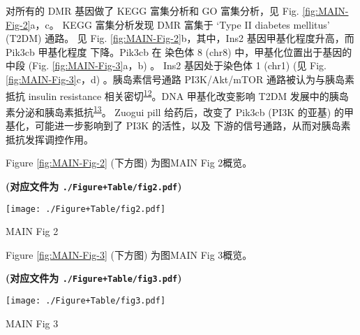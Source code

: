 \documentclass[
]{article}
\begin{document}
对所有的 DMR 基因做了 KEGG 富集分析和 GO 富集分析，见 Fig. \ref{fig:MAIN-Fig-2}a，c。
KEGG 富集分析发现 DMR 富集于 `Type II diabetes mellitus' (T2DM) 通路。
见 Fig. \ref{fig:MAIN-Fig-2}b，其中，Ins2 基因甲基化程度升高，而 Pik3cb 甲基化程度
下降。Pik3cb 在 染色体 8 (chr8) 中，甲基化位置出于基因的中段
(Fig. \ref{fig:MAIN-Fig-3}a，b) 。
Ins2 基因处于染色体 1 (chr1) (见 Fig. \ref{fig:MAIN-Fig-3}c，d) 。胰岛素信号通路 PI3K/Akt/mTOR 通路被认为与胰岛素抵抗 insulin resistance 相关密切\textsuperscript{\protect\hyperlink{ref-ImpairmentOfIRamasu2023}{12}}。DNA 甲基化改变影响 T2DM 发展中的胰岛素分泌和胰岛素抵抗\textsuperscript{\protect\hyperlink{ref-DnaMethylationZhou2018}{13}}。
Zuogui pill 给药后，改变了 Pik3cb (PI3K 的亚基) 的甲基化，可能进一步影响到了 PI3K 的活性，以及
下游的信号通路，从而对胰岛素抵抗发挥调控作用。

\begin{center}\vspace{1.5cm}\end{center}

Figure \ref{fig:MAIN-Fig-2} (下方图) 为图MAIN Fig 2概览。

\textbf{(对应文件为 \texttt{./Figure+Table/fig2.pdf})}

\def\@captype{figure}
\begin{center}
\texttt{[image: ./Figure+Table/fig2.pdf]}
\caption{MAIN Fig 2}\label{fig:MAIN-Fig-2}
\end{center}

\begin{center}\vspace{1.5cm}\end{center}

\begin{center}\vspace{1.5cm}\end{center}

Figure \ref{fig:MAIN-Fig-3} (下方图) 为图MAIN Fig 3概览。

\textbf{(对应文件为 \texttt{./Figure+Table/fig3.pdf})}

\def\@captype{figure}
\begin{center}
\texttt{[image: ./Figure+Table/fig3.pdf]}
\caption{MAIN Fig 3}\label{fig:MAIN-Fig-3}
\end{center}

\begin{center}\vspace{1.5cm}\end{center}
\end{document}

